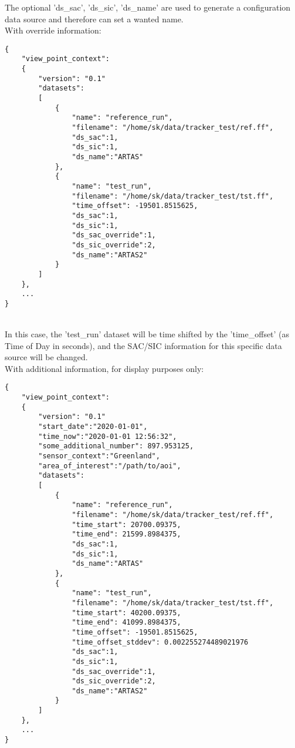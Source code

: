 The optional 'ds\_sac', 'ds\_sic', 'ds\_name' are used to generate a configuration data source and therefore can set a wanted name. \\

With override information:

\begin{lstlisting}[basicstyle=\small\ttfamily]
{
    "view_point_context": 
    {
        "version": "0.1"
        "datasets":
        [
            {
                "name": "reference_run",
                "filename": "/home/sk/data/tracker_test/ref.ff",
                "ds_sac":1,
                "ds_sic":1,
                "ds_name":"ARTAS"
            },
            {
                "name": "test_run",
                "filename": "/home/sk/data/tracker_test/tst.ff",
                "time_offset": -19501.8515625,
                "ds_sac":1,
                "ds_sic":1,
                "ds_sac_override":1,
                "ds_sic_override":2,
                "ds_name":"ARTAS2"
            }
        ]
    },
    ...
}
\end{lstlisting}
\ \\

In this case, the 'test\_run' dataset will be time shifted by the 'time\_offset' (as Time of Day in seconds), and the SAC/SIC information for this specific data source will be changed. \\

With additional information, for display purposes only:

\begin{lstlisting}[basicstyle=\small\ttfamily]
{
    "view_point_context": 
    {
        "version": "0.1"
        "start_date":"2020-01-01",
        "time_now":"2020-01-01 12:56:32",
        "some_additional_number": 897.953125,
        "sensor_context":"Greenland",
        "area_of_interest":"/path/to/aoi",        
        "datasets":
        [
            {
                "name": "reference_run",
                "filename": "/home/sk/data/tracker_test/ref.ff",
                "time_start": 20700.09375,
                "time_end": 21599.8984375,
                "ds_sac":1,
                "ds_sic":1,
                "ds_name":"ARTAS"
            },
            {
                "name": "test_run",
                "filename": "/home/sk/data/tracker_test/tst.ff",
                "time_start": 40200.09375,
                "time_end": 41099.8984375,
                "time_offset": -19501.8515625,
                "time_offset_stddev": 0.002255274489021976
                "ds_sac":1,
                "ds_sic":1,
                "ds_sac_override":1,
                "ds_sic_override":2,
                "ds_name":"ARTAS2"
            }
        ]
    },
    ...
}
\end{lstlisting}
\ \\

